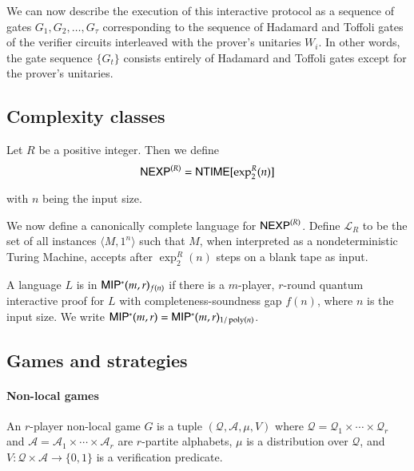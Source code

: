 We can now describe the execution of this interactive protocol as a sequence of gates $G_1,G_2,\ldots,G_\tau$ corresponding to the sequence of Hadamard and Toffoli gates of the verifier circuits interleaved with the prover's unitaries $W_i$. In other words, the gate sequence $\{G_t\}$ consists entirely of Hadamard and Toffoli gates except for the prover's unitaries. %

\subsection{Complexity classes}

\begin{definition}
	Let $R$ be a positive integer. Then we define
	\[
		{\sf NEXP}^{(R)} = {\sf NTIME}[\exp^R_2(n)]
	\]
\end{definition}
with $n$ being the input size. 

We now define a canonically complete language for ${\sf NEXP}^{(R)}$. Define $\mathcal{L}_R$ to be the set of all instances $\langle M, 1^n \rangle$ such that $M$, when interpreted as a nondeterministic Turing Machine, accepts after $\exp^R_2(n)$ steps on a blank tape as input.

\begin{definition}[$\MIPstar$]
	A language $L$ is in ${\sf MIP^*}(m,r)_{f(n)}$ if there is a $m$-player, $r$-round quantum interactive proof for $L$ with completeness-soundness gap $f(n)$, where $n$ is the input size. We write ${\sf MIP^*}(m,r) = {\sf MIP^*}(m,r)_{1/\operatorname{poly}(n)}$.
\end{definition}

\subsection{Games and strategies}

\paragraph{Non-local games} An $r$-player non-local game $G$ is a tuple $(\mathcal{Q},\mathcal{A},\mu,V)$ where $\mathcal{Q} = \mathcal{Q}_1 \times \cdots \times \mathcal{Q}_r$ and $\mathcal{A} = \mathcal{A}_1 \times \cdots \times \mathcal{A}_r$ are $r$-partite alphabets, $\mu$ is a distribution over $\mathcal{Q}$, and $V: \mathcal{Q} \times \mathcal{A} \to \{0,1\}$ is a verification predicate. 



